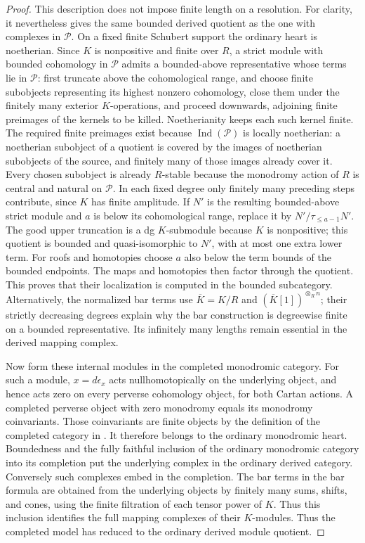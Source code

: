 \documentclass[11pt]{article}
\numberwithin{equation}{section}
\theoremstyle{definition}
\theoremstyle{remark}
\begin{document}
\begin{proof}
This description does not impose finite length on a resolution.
For clarity, it nevertheless gives the same bounded derived quotient
as the one with complexes in $\mathcal P$.  On a fixed finite
Schubert support the ordinary heart is noetherian.  Since $K$ is
nonpositive and finite over $R$, a strict module with bounded
cohomology in $\mathcal P$ admits a bounded-above representative
whose terms lie in $\mathcal P$: first truncate above the
cohomological range, and choose finite subobjects representing
its highest nonzero cohomology, close them under the finitely many
exterior $K$-operations, and proceed downwards, adjoining finite preimages of
the kernels to be killed.  Noetherianity keeps each such kernel
finite.  The required finite preimages exist because
$\operatorname{Ind}(\mathcal P)$ is locally noetherian: a
noetherian subobject of a quotient is covered by the images of
noetherian subobjects of the source, and finitely many of those
images already cover it.  Every chosen subobject is already $R$-stable because the
monodromy action of $R$ is central and natural on $\mathcal P$.
In each fixed degree only finitely many preceding steps
contribute, since $K$ has finite amplitude.  If $N'$ is the
resulting bounded-above strict module and $a$ is below its
cohomological range, replace it by
$N'/\tau_{\leq a-1}N'$.  The good upper truncation is a dg
$K$-submodule because $K$ is nonpositive; this quotient is bounded
and quasi-isomorphic to $N'$, with at most one extra lower term.
For roofs and homotopies choose $a$ also below the term bounds of
the bounded endpoints.  The maps and homotopies then factor through
the quotient.  This proves that their localization is computed in
the bounded subcategory.  Alternatively, the
normalized bar terms use $\overline K=K/R$ and
$(\overline K[1])^{\otimes_R n}$; their strictly decreasing degrees
explain why the bar construction is degreewise finite on a bounded
representative.  Its infinitely many lengths remain essential in
the derived mapping complex.

Now form these internal modules in the completed monodromic category.
For such a module, $x=d\epsilon_x$ acts nullhomotopically on the
underlying object, and hence acts zero on every perverse cohomology
object, for both Cartan actions.  A completed perverse object with
zero monodromy equals its monodromy coinvariants.  Those coinvariants
are finite objects by the definition of the completed category in
\cite[Section~3.1]{Enh:Bezrukavnikov}.  It therefore belongs to the
ordinary monodromic heart.  Boundedness and the fully faithful
inclusion of the ordinary monodromic category into its completion
put the underlying complex in the ordinary derived category.
Conversely such complexes embed in the completion.  The bar terms
in the bar formula are obtained from the underlying objects by
finitely many sums, shifts, and cones, using the finite filtration
of each tensor power of $K$.  Thus this inclusion identifies the full
mapping complexes of their $K$-modules.  Thus the completed model
has reduced to the ordinary derived module quotient.


\end{proof}
\end{document}
